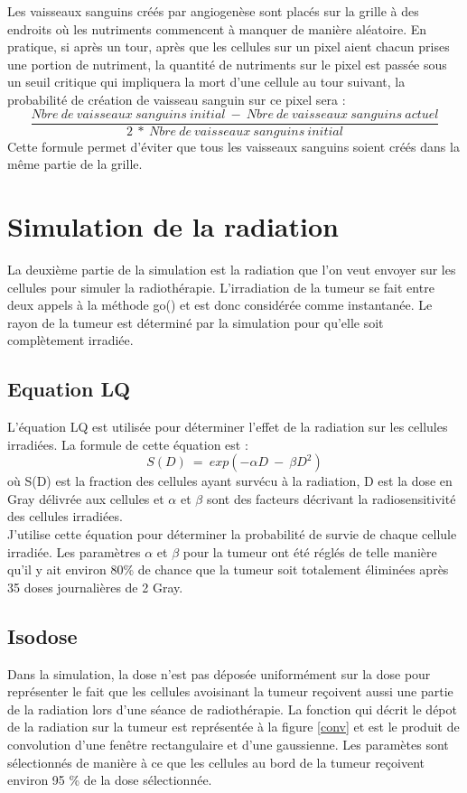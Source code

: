 \documentclass[12pt]{article}
\begin{document}
Les vaisseaux sanguins créés par angiogenèse sont placés sur la grille à des endroits où les nutriments commencent à manquer de manière aléatoire. En pratique, si après un tour, après que les cellules sur un pixel aient chacun prises une portion de nutriment, la quantité de nutriments sur le pixel est passée sous un seuil critique qui impliquera la mort d'une cellule au tour suivant, la probabilité de création de vaisseau sanguin sur ce pixel sera :
$$\frac{Nbre \ de \ vaisseaux \ sanguins \ initial \ - \ Nbre \ de \ vaisseaux \ sanguins \ actuel}{2 \ * \ Nbre \ de \ vaisseaux \ sanguins \ initial}$$
Cette formule permet d'éviter que tous les vaisseaux sanguins soient créés dans la même partie de la grille.
\section{Simulation de la radiation}
La deuxième partie de la simulation est la radiation que l'on veut envoyer sur les cellules pour simuler la radiothérapie. L'irradiation de la tumeur se fait entre deux appels à la méthode go() et est donc considérée comme instantanée. Le rayon de la tumeur est déterminé par la simulation pour qu'elle soit complètement irradiée.
\subsection{Equation LQ}
L'équation LQ est utilisée pour déterminer l'effet de la radiation sur les cellules irradiées.
La formule de cette équation est :
$$ S(D) \ = \ exp(-\alpha D \ - \ \beta D^2)$$
où S(D) est la fraction des cellules ayant survécu à la radiation, D est la dose en Gray délivrée aux cellules et $\alpha$ et $\beta$ sont des facteurs décrivant la radiosensitivité des cellules irradiées.\\

J'utilise cette équation pour déterminer la probabilité de survie de chaque cellule irradiée. Les paramètres $\alpha$ et $\beta$ pour la tumeur ont été réglés de telle manière qu'il y ait environ 80\% de chance que la tumeur soit totalement éliminées après 35 doses journalières de 2 Gray.
\subsection{Isodose}
Dans la simulation, la dose n'est pas déposée uniformément sur la dose pour représenter le fait que les cellules avoisinant la tumeur reçoivent aussi une partie de la radiation lors d'une séance de radiothérapie. La fonction qui décrit le dépot de la radiation sur la tumeur est représentée à la figure \ref{conv} et est le produit de convolution d'une fenêtre rectangulaire et d'une gaussienne. Les paramètes sont sélectionnés de manière à ce que les cellules au bord de la tumeur reçoivent environ 95 \% de la dose sélectionnée. 
\end{document}
